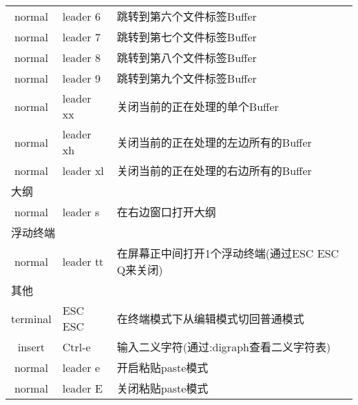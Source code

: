 \documentclass[11pt]{article}
\begin{document}
\begin{left}
\begin{tabular}{|c|l|l|}
    normal & leader 6 & 跳转到第六个文件标签Buffer \\
    normal & leader 7 & 跳转到第七个文件标签Buffer \\
    normal & leader 8 & 跳转到第八个文件标签Buffer \\
    normal & leader 9 & 跳转到第九个文件标签Buffer \\
    normal & leader xx & 关闭当前的正在处理的单个Buffer \\
    normal & leader xh & 关闭当前的正在处理的左边所有的Buffer \\
    normal & leader xl & 关闭当前的正在处理的右边所有的Buffer \\
    \hline \multicolumn{3}{|l|}{大纲} \\ \hline
    normal & leader s & 在右边窗口打开大纲 \\
    \hline \multicolumn{3}{|l|}{浮动终端} \\ \hline
    normal & leader tt & 在屏幕正中间打开1个浮动终端(通过ESC ESC Q来关闭) \\
    \hline \multicolumn{3}{|l|}{其他} \\ \hline                    
    terminal & ESC ESC & 在终端模式下从编辑模式切回普通模式 \\
    insert & Ctrl-e & 输入二义字符(通过:digraph查看二义字符表) \\
    normal & leader e & 开启粘贴paste模式 \\
    normal & leader E & 关闭粘贴paste模式 \\    
    \hline
  \end{tabular}  
\end{left}
\end{document}

